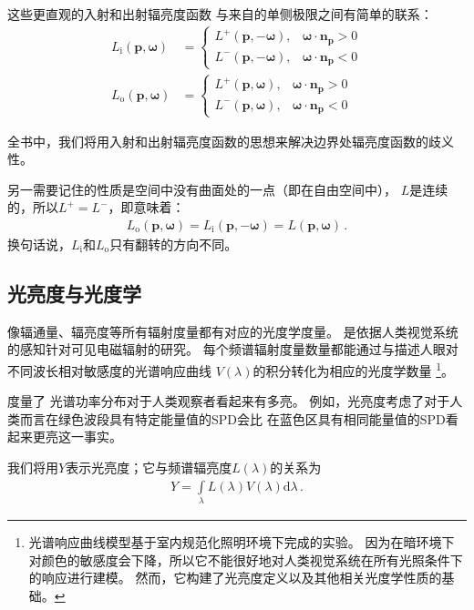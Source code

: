 这些更直观的入射和出射辐亮度函数
与来自的单侧极限之间有简单的联系：
\begin{align*}
    L_{\mathrm{i}}({\bm p},{\bm\omega}) & =\left\{
    \begin{array}{lr}
        L^+({\bm p},-{\bm\omega}), & {\bm\omega}\cdot{\bm n}_{\bm p}>0 \\
        L^-({\bm p},-{\bm\omega}), & {\bm\omega}\cdot{\bm n}_{\bm p}<0
    \end{array}
    \right.                                        \\
    L_{\mathrm{o}}({\bm p},{\bm\omega}) & =\left\{
    \begin{array}{lr}
        L^+({\bm p},{\bm\omega}), & {\bm\omega}\cdot{\bm n}_{\bm p}>0 \\
        L^-({\bm p},{\bm\omega}), & {\bm\omega}\cdot{\bm n}_{\bm p}<0
    \end{array}
    \right.
\end{align*}

全书中，我们将用入射和出射辐亮度函数的思想来解决边界处辐亮度函数的歧义性。

另一需要记住的性质是空间中没有曲面处的一点（即在自由空间中），
$L$是连续的，所以$L^+=L^-$，即意味着：
\begin{align*}
    L_{\mathrm{o}}({\bm p},{\bm\omega})=L_{\mathrm{i}}({\bm p},-{\bm\omega})=L({\bm p},{\bm\omega})\, .
\end{align*}
换句话说，$L_{\mathrm{i}}$和$L_{\mathrm{o}}$只有翻转的方向不同。

\subsection{光亮度与光度学}\label{sub:光亮度与光度学}
像辐通量、辐亮度等所有辐射度量都有对应的光度学度量。
是依据人类视觉系统的感知针对可见电磁辐射的研究。
每个频谱辐射度量数量都能通过与描述人眼对不同波长相对敏感度的光谱响应曲线
$V(\lambda)$的积分转化为相应的光度学数量
\footnote{光谱响应曲线模型基于室内规范化照明环境下完成的实验。
    因为在暗环境下对颜色的敏感度会下降，所以它不能很好地对人类视觉系统在所有光照条件下的响应进行建模。
    然而，它构建了光亮度定义以及其他相关光度学性质的基础。}。

度量了
光谱功率分布对于人类观察者看起来有多亮。
例如，光亮度考虑了对于人类而言在绿色波段具有特定能量值的SPD会比
在蓝色区具有相同能量值的SPD看起来更亮这一事实。

我们将用$Y$表示光亮度；它与频谱辐亮度$L(\lambda)$的关系为
\begin{align*}
    Y=\int\limits_{\lambda}{L(\lambda)V(\lambda)\mathrm{d}\lambda}\, .
\end{align*}

